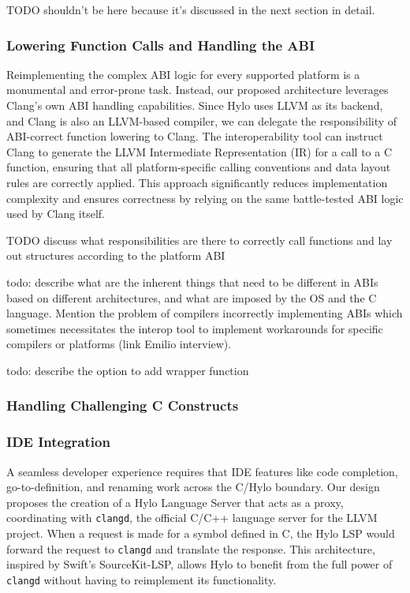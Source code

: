 TODO shouldn't be here because it's discussed in the next section in detail.

\subsubsection{Lowering Function Calls and Handling the ABI}

Reimplementing the complex ABI logic for every supported platform is a monumental and error-prone task. Instead, our proposed architecture leverages Clang's own ABI handling capabilities. Since Hylo uses LLVM as its backend, and Clang is also an LLVM-based compiler, we can delegate the responsibility of ABI-correct function lowering to Clang. The interoperability tool can instruct Clang to generate the LLVM Intermediate Representation (IR) for a call to a C function, ensuring that all platform-specific calling conventions and data layout rules are correctly applied. This approach significantly reduces implementation complexity and ensures correctness by relying on the same battle-tested ABI logic used by Clang itself.

TODO discuss what responsibilities are there to correctly call functions and lay out structures according to the platform ABI

todo: describe what are the inherent things that need to be different in ABIs based on different architectures, and what are imposed by the OS and the C language. Mention the problem of compilers incorrectly implementing ABIs which sometimes necessitates the interop tool to implement workarounds for specific compilers or platforms (link Emilio interview).

todo: describe the option to add wrapper function
\subsubsection{Handling Challenging C Constructs}


\subsubsection{IDE Integration}

A seamless developer experience requires that IDE features like code completion, go-to-definition, and renaming work across the C/Hylo boundary. Our design proposes the creation of a Hylo Language Server that acts as a proxy, coordinating with \texttt{clangd}, the official C/C++ language server for the LLVM project. When a request is made for a symbol defined in C, the Hylo LSP would forward the request to \texttt{clangd} and translate the response. This architecture, inspired by Swift's SourceKit-LSP, allows Hylo to benefit from the full power of \texttt{clangd} without having to reimplement its functionality.

